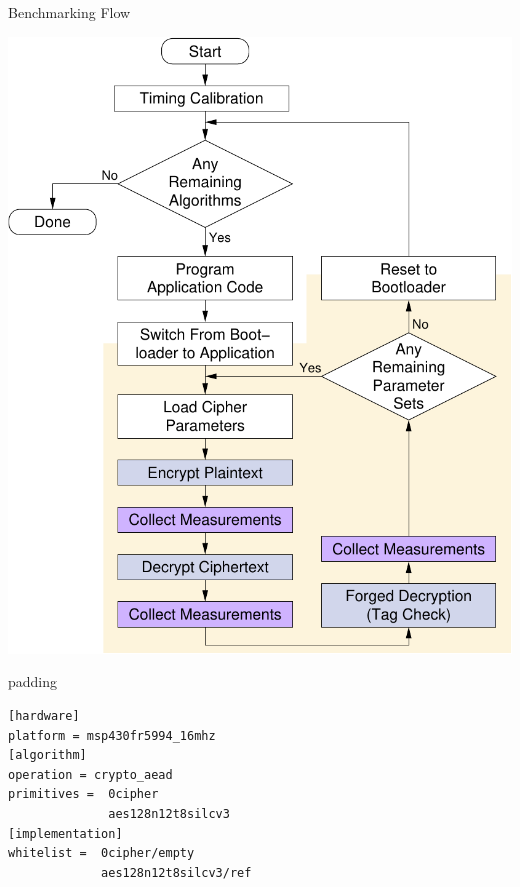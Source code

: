 \documentclass[xcolor=pdftex,dvipsnames,table,final]{beamer}
\begin{document}
\begin{frame}[fragile]{}
\begin{columns}[t, totalwidth=\textwidth]
\begin{column}{.675\linewidth}
\begin{columns}
\begin{column}{.473\linewidth}
      \begin{block}{Benchmarking Flow}
        \begin{center}
          \includegraphics[scale=1.2]{../figures/xxbx_flow}
        \end{center} 
          \begin{center}
            \begin{minipage}{0.9\linewidth}
            \begin{beamercolorbox}[rounded=true]{padding}%
               \footnotesize%
              \begin{lstlisting}
[hardware]
platform = msp430fr5994_16mhz
[algorithm]
operation = crypto_aead
primitives =  0cipher
              aes128n12t8silcv3
[implementation]
whitelist =  0cipher/empty
             aes128n12t8silcv3/ref
              \end{lstlisting}
            \end{beamercolorbox}
            \end{minipage}%
          \end{center}
      \end{block}
     

\end{column}
\end{columns}
\end{column}
\end{columns}
\end{frame}
\end{document}
